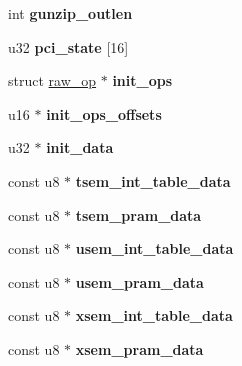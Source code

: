 \begin{DoxyCompactItemize}
\item 
\hypertarget{structbnx2x_a9615b71927437a7688117007d93ec7ff}{
int {\bfseries gunzip\_\-outlen}}
\label{structbnx2x_a9615b71927437a7688117007d93ec7ff}

\item 
\hypertarget{structbnx2x_a22ae81728ad4df9f1a5088e760d0da44}{
u32 {\bfseries pci\_\-state} \mbox{[}16\mbox{]}}
\label{structbnx2x_a22ae81728ad4df9f1a5088e760d0da44}

\item 
\hypertarget{structbnx2x_af9a481f62dbe4609f4a2f8f227418084}{
struct \hyperlink{structraw__op}{raw\_\-op} $\ast$ {\bfseries init\_\-ops}}
\label{structbnx2x_af9a481f62dbe4609f4a2f8f227418084}

\item 
\hypertarget{structbnx2x_aed0eaa54a0bd4f8690391bd57794ed34}{
u16 $\ast$ {\bfseries init\_\-ops\_\-offsets}}
\label{structbnx2x_aed0eaa54a0bd4f8690391bd57794ed34}

\item 
\hypertarget{structbnx2x_a4f057bcd79593799e0b37404d709d0d9}{
u32 $\ast$ {\bfseries init\_\-data}}
\label{structbnx2x_a4f057bcd79593799e0b37404d709d0d9}

\item 
\hypertarget{structbnx2x_a5ead9ca9cff3027ff51a61385a4a865c}{
const u8 $\ast$ {\bfseries tsem\_\-int\_\-table\_\-data}}
\label{structbnx2x_a5ead9ca9cff3027ff51a61385a4a865c}

\item 
\hypertarget{structbnx2x_adb5c725119c7caf03dfba7ba1998cf45}{
const u8 $\ast$ {\bfseries tsem\_\-pram\_\-data}}
\label{structbnx2x_adb5c725119c7caf03dfba7ba1998cf45}

\item 
\hypertarget{structbnx2x_a0b29f708ab624895aa565786cd99fc33}{
const u8 $\ast$ {\bfseries usem\_\-int\_\-table\_\-data}}
\label{structbnx2x_a0b29f708ab624895aa565786cd99fc33}

\item 
\hypertarget{structbnx2x_aa78ebabd19c2d2264ca7f306745398fe}{
const u8 $\ast$ {\bfseries usem\_\-pram\_\-data}}
\label{structbnx2x_aa78ebabd19c2d2264ca7f306745398fe}

\item 
\hypertarget{structbnx2x_a8c762503f66d0359f478e9410d321015}{
const u8 $\ast$ {\bfseries xsem\_\-int\_\-table\_\-data}}
\label{structbnx2x_a8c762503f66d0359f478e9410d321015}

\item 
\hypertarget{structbnx2x_ae1e581755b6bb3ca5a12f84192ef3bb7}{
const u8 $\ast$ {\bfseries xsem\_\-pram\_\-data}}
\label{structbnx2x_ae1e581755b6bb3ca5a12f84192ef3bb7}


\end{DoxyCompactItemize}
